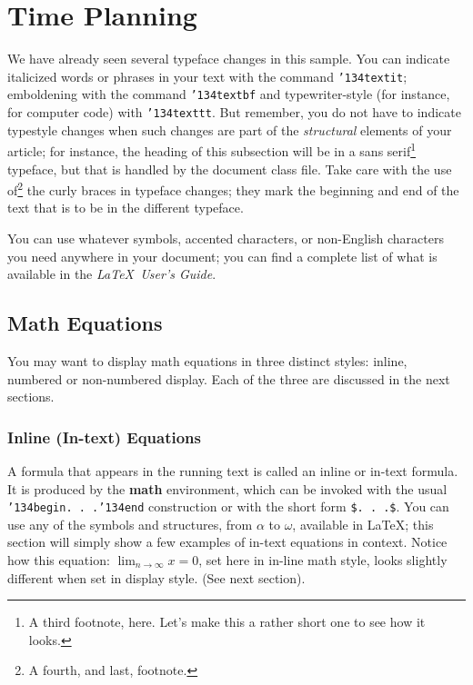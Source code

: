 \documentclass[acmtog, authorversion]{acmart}
\begin{document}
\section{Time Planning}
We have already seen several typeface changes in this sample.  You
can indicate italicized words or phrases in your text with the
command \texttt{{\char'134}textit}; emboldening with the command
\texttt{{\char'134}textbf} and typewriter-style (for instance, for
computer code) with \texttt{{\char'134}texttt}.  But remember, you
do not have to indicate typestyle changes when such changes are
part of the \textit{structural} elements of your article; for
instance, the heading of this subsection will be in a sans
serif\footnote{A third footnote, here. Let's make this a rather
short one to see how it looks.} typeface, but that is handled by
the document class file. Take care with the use of\footnote{A
fourth, and last, footnote.} the curly braces in typeface changes;
they mark the beginning and end of the text that is to be in the
different typeface.

You can use whatever symbols, accented characters, or non-English
characters you need anywhere in your document; you can find a
complete list of what is available in the \textit{\LaTeX\ User's
Guide}\cite{Lamport:LaTeX}.

\subsection{Math Equations}
You may want to display math equations in three distinct styles:
inline, numbered or non-numbered display.  Each of the three are
discussed in the next sections.

\subsubsection{Inline (In-text) Equations}
A formula that appears in the running text is called an inline or
in-text formula.  It is produced by the \textbf{math} environment,
which can be invoked with the usual \texttt{{\char'134}begin. .
.{\char'134}end} construction or with the short form \texttt{\$. .
.\$}. You can use any of the symbols and structures, from $\alpha$
to $\omega$, available in \LaTeX\cite{Lamport:LaTeX}; this section
will simply show a few examples of in-text equations in context.
Notice how this equation: \begin{math}\lim_{n\rightarrow
\infty}x=0\end{math}, set here in in-line math style, looks
slightly different when set in display style.  (See next section).
\end{document}
